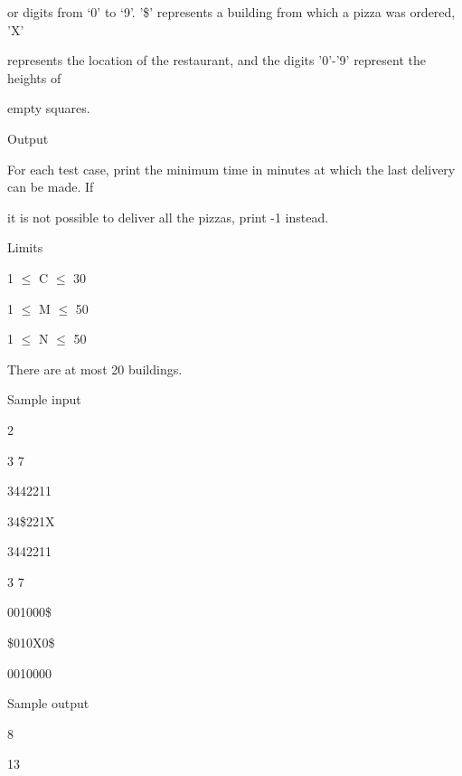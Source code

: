    or digits from ‘0’ to ‘9’. '\$' represents a building from which a pizza was ordered, 'X'   


   represents the location of the restaurant, and the digits '0'-'9' represent the heights of   


   empty squares.  




   Output   


   For each test case, print the minimum time in minutes at which the last delivery can be made. If   


   it is not possible to deliver all the pizzas, print -1 instead.  




   Limits   


   1  $\le$  C  $\le$  30   


   1  $\le$  M  $\le$  50   


   1  $\le$  N  $\le$  50   


   There are at most 20 buildings.  

   Sample input   


   2   


   3 7   


   3442211   


   34\$221X   


   3442211   


   3 7   


   001000\$   


   \$010X0\$   


   0010000  




   Sample output   


   8   


   13  
